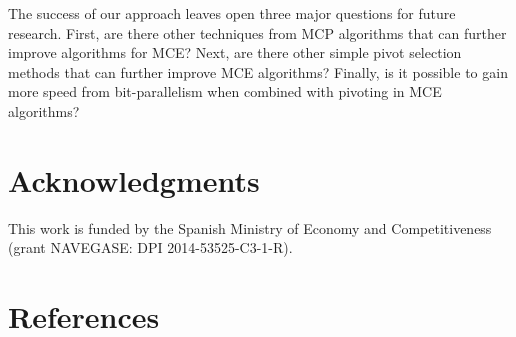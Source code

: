 \documentclass[final,1p]{elsarticle-modified}
\begin{document}
The success of our approach leaves open three major questions for future research. First, are there other techniques from MCP algorithms that can further improve algorithms for MCE? Next, are there other simple pivot selection methods that can further improve MCE algorithms? Finally, is it possible to gain more speed from bit-parallelism when combined with pivoting in MCE algorithms?




\section*{Acknowledgments}
This work is funded by the Spanish Ministry of Economy and Competitiveness (grant NAVEGASE: DPI 2014-53525-C3-1-R).


\section*{References}



\clearpage
\pagestyle{empty}%
\end{document}
